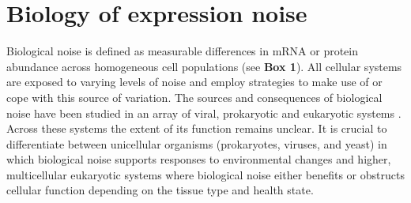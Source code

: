
\section{Biology of expression noise} 

Biological noise is defined as measurable differences in \gls{mRNA} or protein abundance across homogeneous cell populations (see \textbf{Box 1}). All cellular systems are exposed to varying levels of noise and employ strategies to make use of or cope with this source of variation. The sources and consequences of biological noise have been studied in an array of viral, prokaryotic and eukaryotic systems \citep{Raj2010, Balazsi2011, Eldar2010}. Across these systems the extent of its function remains unclear. It is crucial to differentiate between unicellular organisms (prokaryotes, viruses, and yeast) in which biological noise supports responses to environmental changes and higher, multicellular eukaryotic systems where biological noise either benefits or obstructs cellular function depending on the tissue type and health state.\\

